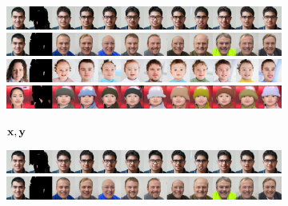 \begin{figure}[t]
  \centering
  \begin{subfigure}[t]{0.14\textwidth}
    \centering
    \includegraphics[trim=0px 0px 2560px 0px, clip, height=\cmgfailureimgheight]{figs/cigcvae/co_mod_gan_failure/co_mod_gan_0_3_2.jpg}
    \includegraphics[trim=0px 0px 2560px 0px, clip, height=\cmgfailureimgheight]{figs/cigcvae/co_mod_gan_failure/co_mod_gan_0_4_2.jpg}
    \includegraphics[trim=0px 0px 2560px 0px, clip, height=\cmgfailureimgheight]{figs/cigcvae/co_mod_gan_failure/co_mod_gan_1_4_2.jpg}
    \includegraphics[trim=0px 0px 2560px 0px, clip, height=\cmgfailureimgheight]{figs/cigcvae/co_mod_gan_failure/co_mod_gan_56_4_12.jpg}
    \caption{$\mathbf{x}, \mathbf{y}$}
  \end{subfigure}
  \begin{subfigure}[t]{0.73\textwidth}
    \centering
    \includegraphics[trim=512px 0px 0px 0px, clip, height=\cmgfailureimgheight]{figs/cigcvae/co_mod_gan_failure/co_mod_gan_0_3_2.jpg}
    \includegraphics[trim=512px 0px 0px 0px, clip, height=\cmgfailureimgheight]{figs/cigcvae/co_mod_gan_failure/co_mod_gan_0_4_2.jpg}

\end{subfigure}
\end{figure}
